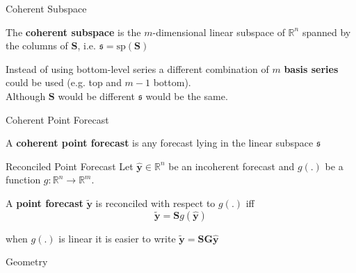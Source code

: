 \documentclass[handout]{beamer}
\begin{document}
  \begin{frame}{Coherent Subspace}
    \begin{definition} 
	  The {\bf coherent subspace} is the $m$-dimensional linear subspace of $\mathbb{R}^n$ spanned by the columns of ${\bm S}$, i.e. $\mathfrak{s}=\mbox{sp}({\bm S})$
    \end{definition}
    Instead of using bottom-level series a different combination of $m$ {\bf basis series} could be used (e.g. top and $m-1$ bottom).\\
    Although ${\bm S}$ would be different $\mathfrak{s}$ would be the same.
  \end{frame}
  \begin{frame}{Coherent Point Forecast}
  \begin{definition} 
  	A {\bf coherent point forecast} is any forecast lying in the linear subspace $\mathfrak{s}$
  \end{definition}
  \end{frame}
  \begin{frame}{Reconciled Point Forecast}
  Let $\hat{\bm y}\in\mathbb{R}^n$ be an incoherent forecast and $g(.)$ be a function $g:\mathbb{R}^n\rightarrow\mathbb{R}^m$.
  \begin{definition} 
	A {\bf point forecast} $\tilde{\bm y}$ is reconciled with respect to $g(.)$ iff 
	\begin{equation*}
    \tilde{\bm y}={\bm S}g(\hat{\bm y})
	\end{equation*}
  \end{definition}
  when $g(.)$ is linear it is easier to write $\tilde{\bm y}={\bm S}{\bm G}\hat{\bm y}$
  \end{frame}
  \begin{frame}{Geometry}
  \vspace{-2.3cm}
  \centering 
  
  \end{frame}
\end{document}
